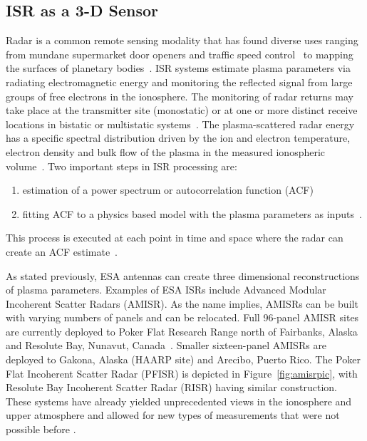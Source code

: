 \subsection{ISR as a 3-D Sensor}
Radar is a common remote sensing modality that has found diverse uses ranging from mundane supermarket door openers and traffic speed control~\cite{richards2010principles} to mapping the surfaces of planetary bodies~\cite{campbell2002radar}. ISR systems estimate plasma parameters via radiating electromagnetic energy and monitoring the reflected signal from large groups of free electrons in the ionosphere. The monitoring of radar returns may take place at the transmitter site (monostatic) or at one or more distinct receive locations in bistatic or multistatic systems~\cite{RDS:RDS2903}. The plasma-scattered radar energy has a specific spectral distribution driven by the ion and electron temperature, electron density and bulk flow of the plasma in the measured ionospheric volume~\cite{dougherty:farley1960,farleydougherty:ISR2,doughteryfarley:ISR3,hagfors1961}. Two important steps in ISR processing are:
\begin{enumerate}
\item estimation of a power spectrum or autocorrelation function (ACF)~\cite{farley1969}
\item fitting ACF to a physics based model with the plasma parameters as inputs~\cite{RDS:RDS1387}.
\end{enumerate}
This process is executed at each point in time and space where the radar can create an ACF estimate~\cite{nikoukar2008}. 

As stated previously, ESA antennas can create three dimensional reconstructions of plasma parameters. Examples of ESA ISRs include Advanced Modular Incoherent Scatter Radars (AMISR).
As the name implies, AMISRs can be built with varying numbers of panels and can be relocated.
Full 96-panel AMISR sites are currently deployed to Poker Flat Research Range north of Fairbanks, Alaska and Resolute Bay, Nunavut, Canada~\cite{Semeter2009738,Valentic:2013jg}. 
Smaller sixteen-panel AMISRs are deployed to Gakona, Alaska (HAARP site) and Arecibo, Puerto Rico.
The Poker Flat Incoherent Scatter Radar (PFISR) is depicted in Figure~\ref{fig:amisrpic}, with Resolute Bay Incoherent Scatter Radar (RISR) having similar construction. 
These systems have already yielded unprecedented views in the ionosphere and upper atmosphere and allowed for new types of measurements that were not possible before \cite{semeter2010CI,butler:imagingfregiondrifts,Nicolls:2007ie}. %

